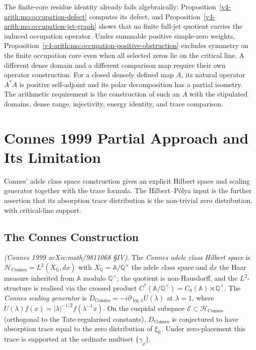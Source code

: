 \begin{remark}
\label{v4-arith:w9-r4:rem:no-domain-gives-SA}
The finite-core residue identity already fails algebraically:
Proposition~\ref{v4-arith:mo:occupation-defect} computes its defect, and
Proposition~\ref{v4-arith:mo:occupation-jet-graph} shows that no finite full-jet
quotient carries the induced occupation operator.
Under summable positive simple-zero weights,
Proposition~\ref{v4-arith:mo:occupation-positive-obstruction} excludes symmetry
on the finite occupation core even when all selected zeros lie
on the critical line. A different dense domain and a different
comparison map require their own operator construction.
For a closed densely defined map $A$, its natural operator $A^*A$
is positive self-adjoint and its polar decomposition has a partial
isometry. The arithmetic requirement is the construction of such
an $A$ with the stipulated domains, dense range, injectivity,
energy identity, and trace comparison.
\end{remark}

\section{Connes 1999 Partial Approach and Its Limitation}
\label{v4-arith:w9-r4:connes-1999}

Connes' adele class space construction gives an explicit Hilbert space
and scaling generator together with the trace formula. The
Hilbert--P\'olya input is the further assertion that its absorption
trace distribution is the non-trivial zero distribution, with
critical-line support.

\subsection{The Connes Construction}
\label{v4-arith:w9-r4:connes-1999:construction}

\begin{definition}
\label{v4-arith:w9-r4:def:connes-data}
\ClaimStatusDefinitional \emph{(Connes 1999 arXiv:math/9811068 \S IV)}.
The \emph{Connes adele class Hilbert space} is
\(\mathcal{H}_{\mathrm{Connes}}=L^{2}(X_{\mathbb{Q}},dx)\) with
\(X_{\mathbb{Q}}=\mathbb{A}/\mathbb{Q}^{\times}\) the adele class space
and \(dx\) the Haar measure inherited from \(\mathbb{A}\) modulo
\(\mathbb{Q}^{\times}\); the quotient is non-Hausdorff, and the
\(L^{2}\)-structure is realised via the crossed product
\(C^{*}(\mathbb{A}/\mathbb{Q}^{\times})=C_{0}(\mathbb{A})\rtimes\mathbb{Q}^{\times}\).
The \emph{Connes scaling generator} is
\(D_{\mathrm{Connes}}=-i\partial_{\log\lambda}U(\lambda)\) at
\(\lambda=1\), where \(U(\lambda)f(x)=|\lambda|^{-1/2}f(\lambda^{-1}x)\).
On the cuspidal subspace
\(\mathcal{E}\subset\mathcal{H}_{\mathrm{Connes}}\) (orthogonal to the
Tate-regularised constants), \(D_{\mathrm{Connes}}\) is conjectured to
have absorption trace equal to the zero distribution of
\(\xi_{\mathbb R}\). Under zero-placement this trace is supported at
the ordinate multiset \(\{\gamma_{\rho}\}\).
\end{definition}

